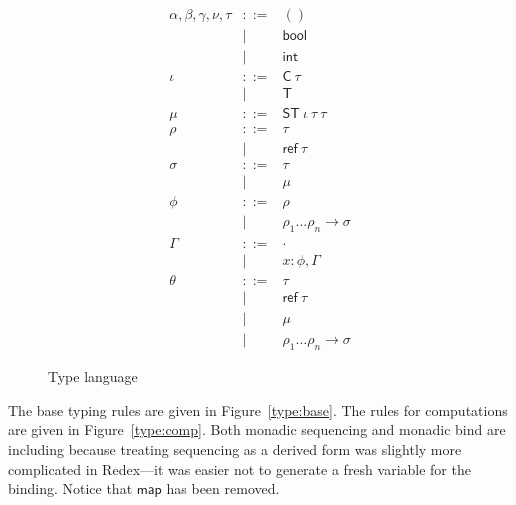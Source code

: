 \documentclass[twocolumn]{article}
\newcommand{\bnfdef}{::=}
\newcommand{\bnfalt}{\mathrel{\mid}}
\newcommand{\kw}[1]{\textsf{#1}}
\begin{document}
\begin{figure}
\begin{equation*}
\begin{array}{lcl}
  \alpha, \beta, \gamma, \nu, \tau
     & \bnfdef & () \\
     & \bnfalt & \kw{bool} \\
     & \bnfalt & \kw{int} \\
  \iota
     & \bnfdef & \kw{C}~ \tau \\
     & \bnfalt & \kw{T} \\
  \mu
     & \bnfdef & \kw{ST}~ \iota~ \tau~ \tau~ \\
  \rho
     & \bnfdef & \tau \\
     & \bnfalt & \kw{ref}~ \tau \\
  \sigma
     & \bnfdef & \tau \\
     & \bnfalt & \mu \\
  \phi
     & \bnfdef & \rho \\
     & \bnfalt & \rho_1 \ldots \rho_n \to \sigma \\
  \Gamma
     & \bnfdef & \cdot \\
     & \bnfalt & x : \phi, \Gamma \\
  \theta
     & \bnfdef & \tau \\
     & \bnfalt & \kw{ref}~ \tau \\
     & \bnfalt & \mu \\
     & \bnfalt & \rho_1 \ldots \rho_n \to \sigma
\end{array}
\end{equation*}
\caption{Type language}
\label{fig:lang:type}
\end{figure}

The base typing rules are given in Figure~\ref{type:base}. The rules for
computations are given in Figure~\ref{type:comp}. Both monadic sequencing and
monadic bind are including because treating sequencing as a derived form was
slightly more complicated in Redex---it was easier not to generate a fresh
variable for the binding. Notice that $\kw{map}$ has been removed.
\end{document}
